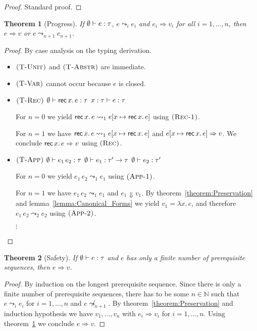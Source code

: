 \documentclass[12pt,a2paper,draft]{article}
\newcommand{\abstr}[2]{\ensuremath{\lambda{#1}.\,{#2}}}
\newcommand{\app}[2]{\ensuremath{{#1}\,{#2}}}
\newcommand{\rec}[2]{\ensuremath{{\normalfont\textsf{rec}}\,{#1}.\,{#2}}}
\newcommand{\Tj}[3]{\mbox{\ensuremath{{#1}\vdash{#2}:{#3}}}}
\newcommand{\tj}[2]{\Tj{\emptyset}{#1}{#2}}
\newcommand{\rn}[1]{\mbox{\ensuremath{\textsc{(#1)}}}}
\newtheorem{theorem}{Theorem}
\begin{document}
\begin{proof}
  Standard proof.
\end{proof}

\begin{theorem}[Progress] \label{theorem:Progress}
  If $\tj{e}{\tau}$, $e \leadsto_i e_i$ and $e_i \Rightarrow v_i$ for all $i=1,\ldots,n$, then
  $e \Rightarrow v$ or $e \leadsto_{n+1} e_{n+1}$.
\end{theorem}

\begin{proof}
  By case analysis on the typing derivation.
  \begin{itemize}
  \item \rn{T-Unit} and \rn{T-Abstr} are immediate.
  \item \rn{T-Var} cannot occur because $e$ is closed.
  \item \rn{T-Rec} \quad $\tj{\rec{x}{e}}{\tau}$ \quad $\Tj{x:\tau}{e}{\tau}$

    For $n = 0$ we yield $\rec{x}{e} \leadsto_1 e[x \mapsto \rec{x}{e}]$ using \rn{Rec-1}.

    For $n = 1$ we have $\rec{x}{e} \leadsto_1 e[x \mapsto \rec{x}{e}]$ and
    $e[x \mapsto \rec{x}{e}] \Rightarrow v$. We conclude $\rec{x}{e} \Rightarrow v$
    using \rn{Rec}.

  \item \rn{T-App} \quad $\tj{\app{e_1}{e_2}}{\tau}$ \quad $\tj{e_1}{\tau' \to \tau}$ \quad $\tj{e_2}{\tau'}$

    For $n = 0$ we yield $\app{e_1}{e_2} \leadsto_1 e_1$ using \rn{App-1}.

    For $n = 1$ we have $\app{e_1}{e_2} \leadsto_1 e_1$ and $e_1 \Downarrow v_1$.
    By theorem~\ref{theorem:Preservation} and lemma~\ref{lemma:Canonical_Forms} we
    yield $v_1 = \abstr{x}{e}$, and therefore $\app{e_1}{e_2} \leadsto_2 e_2$ using
    \rn{App-2}.

    $\vdots$
  \end{itemize}
\end{proof}

\begin{theorem}[Safety]
  If $\tj{e}{\tau}$ and $e$ has only a finite number of prerequisite sequences, then $e \Rightarrow v$.
\end{theorem}

\begin{proof}
  By induction on the longest prerequisite sequence.
  Since there is only a finite number of prerequisite sequences, there has to be some $n \in \mathbb{N}$
  such that $e \leadsto_i e_i$ for $i = 1,\ldots,n$ and $e \not\leadsto_{n+1}$. By theorem~\ref{theorem:Preservation}
  and induction hypothesis we have $v_1,\ldots,v_n$ with $e_i \Rightarrow v_i$ for $i=1,\ldots,n$. Using
  theorem~\ref{theorem:Progress} we conclude $e \Rightarrow v$.
\end{proof}
\end{document}
